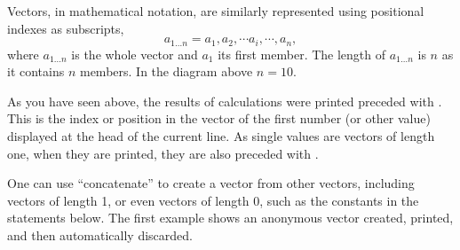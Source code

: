 \documentclass[krantz2]{krantz}\usepackage{knitr}
\begin{document}
\begin{center}
\begin{small}
\end{small}
\end{center}

Vectors, in mathematical notation, are similarly represented using positional indexes as subscripts,
\begin{equation}\label{eq:vector}
  a_{1\ldots n} = a_1, a_2, \cdots a_i, \cdots, a_n,
\end{equation}
where $a_{1\ldots n}$ is the whole vector and $a_1$ its first member. The length of $a_{1\ldots n}$ is $n$ as it contains $n$ members. In the diagram above $n = 10$.

As you have seen above, the results of calculations were printed preceded with \code{[1]}. This is the index or position in the vector of the first number (or other value) displayed at the head of the current line. As single values are vectors of length one, when they are printed, they are also preceded with \code{[1]}.

One can use  ``concatenate'' to create a vector from other vectors, including vectors of length 1, or even vectors of length 0, such as the  constants in the statements below. The first example shows an anonymous vector created, printed, and then automatically discarded.
\end{document}
